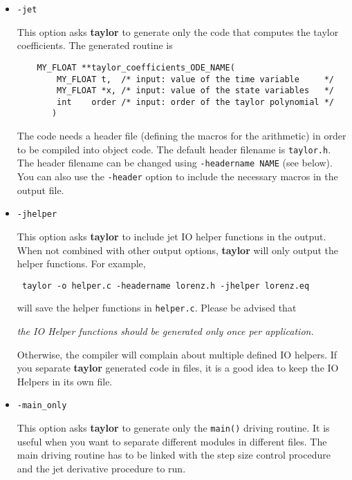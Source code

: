 \documentclass[10pt]{article}
\theoremstyle{remark}
\newcommand{\taylorname}{{\bf taylor}}
\begin{document}
\begin{itemize}
{Moreover, if the flag {\tt -name ODENAME} is also used, the
header file will also contain the prototypes for the main functions of
the Taylor integrator.}

\item{\verb+-jet+

This option asks \taylorname{} to generate only the code that computes
the taylor coefficients. The generated routine is

\begin{verbatim}
    MY_FLOAT **taylor_coefficients_ODE_NAME(
        MY_FLOAT t,  /* input: value of the time variable     */
        MY_FLOAT *x, /* input: value of the state variables   */
        int    order /* input: order of the taylor polynomial */
       )
\end{verbatim}

The code needs a header file (defining the macros for the arithmetic)
in order to be compiled into object code. The default header filename
is {\tt taylor.h}.  The header filename can be changed using
{\verb+-headername NAME+} (see below).  You can also use the
{\verb+-header+} option to include the necessary macros in the output
file.}

\item{\verb+-jhelper+

This option asks \taylorname{} to include jet IO helper functions in
the output.  When not combined with other output options,
\taylorname{} will only output the helper functions. For example,

\verb+ taylor -o helper.c -headername lorenz.h -jhelper lorenz.eq+

will save the helper functions in \verb+helper.c+. Please be advised
that
\begin{center} 
{\em the IO Helper functions should be generated only once per
  application.}
\end{center} 
Otherwise, the compiler will complain about multiple defined IO
helpers.  If you separate \taylorname{} generated code in files, it is
a good idea to keep the IO Helpers in its own file.  }


\item{\verb+-main_only+

This option asks \taylorname{} to generate only the \verb+main()+
driving routine. It is useful when you want to separate different
modules in different files. The main driving routine has to be linked
with the step size control procedure and the jet derivative procedure
to run.  }


\end{itemize}
\end{document}
